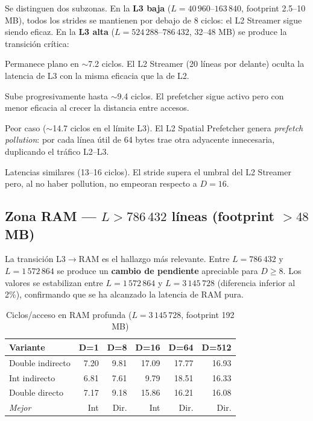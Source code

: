 \documentclass[12pt,a4paper]{article}
\begin{document}
Se distinguen dos subzonas.
En la \textbf{L3 baja} ($L = 40\,960$--$163\,840$, footprint 2.5--10 MB), todos los strides se mantienen por debajo de 8 ciclos: el L2 Streamer sigue siendo eficaz.
En la \textbf{L3 alta} ($L = 524\,288$--$786\,432$, 32--48 MB) se produce la transición crítica:

\begin{description}[leftmargin=1.5em]
  \item[$D=1$:] Permanece plano en $\sim$7.2 ciclos.
  El L2 Streamer (20 líneas por delante) oculta la latencia de L3 con la misma eficacia que la de L2.
  \item[$D=8$:] Sube progresivamente hasta $\sim$9.4 ciclos. El prefetcher sigue activo pero con menor eficacia al crecer la distancia entre accesos.
  \item[$D=16$:] Peor caso ($\sim$14.7 ciclos en el límite L3). El L2 Spatial Prefetcher genera \emph{prefetch pollution}: por cada línea útil de 64 bytes trae otra adyacente innecesaria, duplicando el tráfico L2--L3.
  \item[$D=64$ y $D=512$:] Latencias similares (13--16 ciclos). El stride supera el umbral del L2 Streamer pero, al no haber pollution, no empeoran respecto a $D=16$.
\end{description}

\subsection{Zona RAM --- $L > 786\,432$ líneas (footprint $> 48$ MB)}

La transición L3$\to$RAM es el hallazgo más relevante.
Entre $L=786\,432$ y $L=1\,572\,864$ se produce un \textbf{cambio de pendiente} apreciable para $D \geq 8$.
Los valores se estabilizan entre $L=1\,572\,864$ y $L=3\,145\,728$ (diferencia inferior al 2\%), confirmando que se ha alcanzado la latencia de RAM pura.

\begin{table}[H]
\centering
\caption{Ciclos/acceso en RAM profunda ($L=3\,145\,728$, footprint 192 MB)}
\label{tab:ram_comparativa}
\footnotesize
\begin{tabular}{lrrrrr}
\toprule
\textbf{Variante} & \textbf{D=1} & \textbf{D=8} & \textbf{D=16} & \textbf{D=64} & \textbf{D=512} \\
\midrule
Double indirecto & 7.20 & 9.81 & 17.09 & 17.77 & 16.93 \\
Int indirecto    & 6.81 & 7.61 &  9.79 & 18.51 & 16.33 \\
Double directo   & 7.17 & 9.18 & 15.86 & 16.21 & 16.08 \\
\midrule
\textit{Mejor}   & Int  & Dir. & Int   & Dir.  & Dir.  \\
\bottomrule
\end{tabular}
\end{table}
\end{document}
